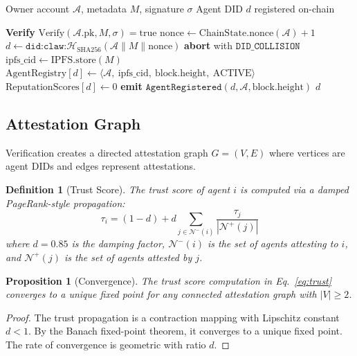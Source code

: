 \documentclass[conference]{IEEEtran}
\newtheorem{proposition}[theorem]{Proposition}
\newtheorem{definition}{Definition}
\begin{document}
\begin{algorithm}[t]
\caption{Agent Registration Protocol}
\label{alg:registration}
\begin{algorithmic}[1]
\REQUIRE Owner account $\mathcal{A}$, metadata $M$, signature $\sigma$
\ENSURE Agent DID $d$ registered on-chain

\STATE \textbf{Verify} $\text{Verify}(\mathcal{A}.\text{pk}, M, \sigma) = \text{true}$
\STATE $\text{nonce} \leftarrow \text{ChainState.nonce}(\mathcal{A}) + 1$
\STATE $d \leftarrow \texttt{did:claw:}\mathcal{H}_{\text{SHA256}}(\mathcal{A} \| M \| \text{nonce})$
    \STATE \textbf{abort} with $\texttt{DID\_COLLISION}$
\ENDIF
\STATE $\text{ipfs\_cid} \leftarrow \text{IPFS.store}(M)$ 
\STATE $\text{AgentRegistry}[d] \leftarrow \langle \mathcal{A},\ \text{ipfs\_cid},\ \text{block.height},\ \text{ACTIVE} \rangle$
\STATE $\text{ReputationScores}[d] \leftarrow 0$
\STATE \textbf{emit} $\texttt{AgentRegistered}(d, \mathcal{A}, \text{block.height})$
\RETURN $d$
\end{algorithmic}
\end{algorithm}

\subsection{Attestation Graph}

Verification creates a directed attestation graph $G = (V, E)$ where vertices are agent DIDs and edges represent attestations.

\begin{definition}[Trust Score]
The trust score of agent $i$ is computed via a damped PageRank-style propagation:
\begin{equation}\label{eq:trust}
    \tau_i = (1 - d) + d \sum_{j \in \mathcal{N}^{-}(i)} \frac{\tau_j}{|\mathcal{N}^{+}(j)|}
\end{equation}
where $d = 0.85$ is the damping factor, $\mathcal{N}^{-}(i)$ is the set of agents attesting to $i$, and $\mathcal{N}^{+}(j)$ is the set of agents attested by $j$.
\end{definition}

\begin{proposition}[Convergence]
The trust score computation in Eq.~\eqref{eq:trust} converges to a unique fixed point for any connected attestation graph with $|V| \geq 2$.
\end{proposition}

\begin{proof}
The trust propagation is a contraction mapping with Lipschitz constant $d < 1$. By the Banach fixed-point theorem, it converges to a unique fixed point. The rate of convergence is geometric with ratio $d$.
\end{proof}
\end{document}
